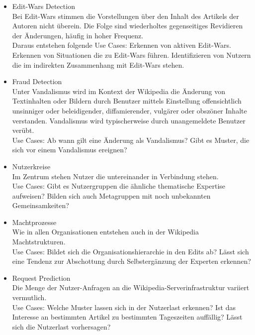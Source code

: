 \begin{itemize}
    \item Edit-Wars Detection\\ Bei Edit-Wars stimmen die Vorstellungen über den Inhalt des Artikels der Autoren nicht überein. Die Folge sind wiederholtes gegenseitiges Revidieren der Änderungen, häufig in hoher Frequenz.\cite{wikipediaprob.}\\ Daraus entstehen folgende Use Cases: Erkennen von aktiven Edit-Wars. Erkennen von Situationen die zu Edit-Wars führen. Identifizieren von Nutzern die im indirekten Zusammenhang mit Edit-Wars stehen.
    \item Fraud Detection\\Unter Vandalismus wird im Kontext der Wikipedia die Änderung von Textinhalten oder Bildern durch Benutzer mittels Einstellung offensichtlich unsinniger oder beleidigender, diffamierender, vulgärer oder obszöner Inhalte verstanden. Vandalismus wird typischerweise durch unangemeldete Benutzer verübt.\cite{wikipediaprob.} \\Use Cases: Ab wann gilt eine Änderung als Vandalismus? Gibt es Muster, die sich vor einem Vandalismus ereignen? 
    \item Nutzerkreise\\Im Zentrum stehen Nutzer die untereinander in Verbindung stehen.\\Use Cases: Gibt es Nutzergruppen die ähnliche thematische Expertise aufweisen? Bilden sich auch Metagruppen mit noch unbekannten Gemeinsamkeiten?
    \item Machtprozesse\\Wie in allen Organisationen entstehen auch in der Wikipedia Machtstrukturen.\\Use Cases: Bildet sich die Organisationshierarchie in den Edits ab? Lässt sich eine Tendenz zur Abschottung durch Selbstergänzung der Experten erkennen?\cite{wikipedia.}
    \item Request Prediction\\Die Menge der Nutzer-Anfragen an die Wikipedia-Serverinfrastruktur variiert vermutlich.\\Use Cases: Welche Muster lassen sich in der Nutzerlast erkennen? Ist das Interesse an bestimmten Artikel zu bestimmten Tageszeiten auffällig? Lässt sich die Nutzerlast vorhersagen?
\end{itemize}
